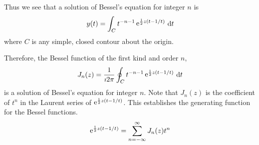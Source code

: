 {\begin{Solution}
  Thus we see that a solution of Bessel's equation for integer $n$ is
  \[
  y(t) = \int_C t^{-n-1} \mathop{\mathrm{e}}\nolimits^{ \frac{1}{2} z (t - 1/t) }\,\mathrm{d} t
  \]
  where $C$ is any simple, closed contour about the origin.

  Therefore, the Bessel function of the first kind and order $n$,
  \[
  J_n(z) = \frac{1}{\imath 2 \pi} \oint_C t^{-n-1} \mathop{\mathrm{e}}\nolimits^{ \frac{1}{2} z (t - 1/t) } \,\mathrm{d} t
  \]
  is a solution of Bessel's equation for integer $n$.
  Note that $J_n(z)$ is the coefficient of $t^n$ in the Laurent series of
  $\mathop{\mathrm{e}}\nolimits^{\frac{1}{2} z (t - 1/t)}$.  This establishes the generating function
  for the Bessel functions.
  \[
  \mathop{\mathrm{e}}\nolimits^{ \frac{1}{2} z (t - 1/t) } = \sum_{n = -\infty}^\infty J_n(z) t^n
  \]
\end{Solution}








}
